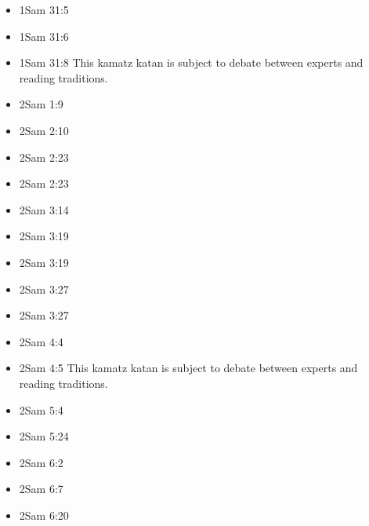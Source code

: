 \documentclass[14pt]{book}
\begin{document}
\begin{multicols}{2}
\begin{itemize}
							\item 1Sam 31:5
							
							\item 1Sam 31:6
							
							\item 1Sam 31:8 This kamatz katan is subject to debate between experts and reading traditions.
							
							\item 2Sam 1:9
							
							\item 2Sam 2:10
							
							\item 2Sam 2:23
							
							\item 2Sam 2:23
							
							\item 2Sam 3:14
							
							\item 2Sam 3:19
							
							\item 2Sam 3:19
							
							\item 2Sam 3:27
							
							\item 2Sam 3:27
							
							\item 2Sam 4:4
							
							\item 2Sam 4:5 This kamatz katan is subject to debate between experts and reading traditions.
							
							\item 2Sam 5:4
							
							\item 2Sam 5:24
							
							\item 2Sam 6:2
							
							\item 2Sam 6:7
							
							\item 2Sam 6:20
							

\end{itemize}
\end{multicols}
\end{document}
